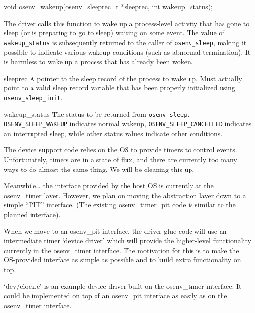 \begin{apisyn}

	\funcproto void osenv_wakeup(osenv_sleeprec_t *sleeprec,
                                     int wakeup_status);
\end{apisyn}
\drvtoosn
\begin{apidesc}
	The driver calls this function
	to wake up a process-level activity
	that has gone to sleep (or is preparing to go to sleep)
	waiting on some event. The value of {\tt wakeup_status} is
	subsequently returned to the caller of {\tt osenv_sleep}, making it
	possible to indicate various wakeup conditions (such as abnormal
	termination). 
	It is harmless to wake up a process
	that has already been woken.
\end{apidesc}
\begin{apiparm}
	\item[sleeprec]
		A pointer to the sleep record of the process to wake up.
		Must actually point to a valid sleep record variable
		that has been properly initialized using {\tt
		osenv_sleep_init}. 
	\item[wakeup_status]
		The status to be returned from {\tt osenv_sleep}.
		{\tt OSENV_SLEEP_WAKEUP} indicates normal wakeup,
		{\tt OSENV_SLEEP_CANCELLED} indicates an interrupted sleep,
		while other status values indicate other conditions.
\end{apiparm}




The device support code relies on the OS to provide timers
to control events.  Unfortunately, timers are in a state
of flux, and there are currently too many ways to do almost the same thing.
We will be cleaning this up.

Meanwhile\ldots{}
the interface provided by the host OS is currently at the osenv_timer layer.
However, we plan on moving the abstraction layer down to a
simple ``PIT'' interface.
(The existing osenv_timer_pit code is similar to the planned interface).

When we move to an osenv_pit interface,
the driver glue code will use an intermediate timer
`device driver' which will provide the higher-level
functionality currently in the osenv_timer interface.
The motivation for this is to make the OS-provided interface
as simple as possible and to build extra functionality on top.

`dev/clock.c' is an example device driver built on the
osenv_timer interface.
It could be implemented on top of an osenv_pit interface
as easily as on the osenv_timer interface.

